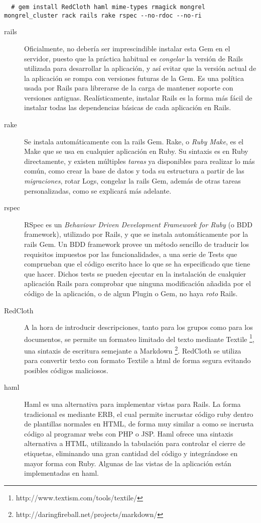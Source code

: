 \begin{verbatim}
  # gem install RedCloth haml mime-types rmagick mongrel mongrel_cluster rack rails rake rspec --no-rdoc --no-ri
\end{verbatim}

\begin{description}
  \item[rails] Oficialmente, no debería ser imprescindible instalar esta Gem en el servidor, puesto que la práctica habitual es \emph{congelar} la versión de Rails utilizada para desarrollar la aplicación, y así evitar que la versión actual de la aplicación se rompa con versiones futuras de la Gem. Es una política usada por Rails para librerarse de la carga de mantener soporte con versiones antiguas. Realísticamente, instalar Rails es la forma más fácil de instalar todas las dependencias básicas de cada aplicación en Rails.
  \item[rake] Se instala automáticamente con la rails Gem. Rake, o \emph{Ruby Make}, es el Make que se usa en cualquier aplicación en Ruby. Su sintaxis es en Ruby directamente, y existen múltiples \emph{tareas} ya disponibles para realizar lo más común, como crear la base de datos y toda su estructura a partir de las \emph{migraciones}, rotar Logs, congelar la rails Gem, además de otras tareas personalizadas, como se explicará más adelante. 
  \item[rspec] RSpec es un \emph{Behaviour Driven Development Framework for Ruby} (o BDD framework), utilizado por Rails, y que se instala automáticamente por la rails Gem. Un BDD framework provee un método sencillo de traducir los requisitos impuestos por las funcionalidades, a una serie de Tests que comprueban que el código escrito hace lo que se ha especificado que tiene que hacer. Dichos tests se pueden ejecutar en la instalación de cualquier aplicación Rails para comprobar que ninguna modificación añadida por el código de la aplicación, o de algun Plugin o Gem, no haya \emph{roto} Rails.
  \item[RedCloth] A la hora de introducir descripciones, tanto para los grupos como para los documentos, se permite un formateo limitado del texto mediante Textile \footnote{http://www.textism.com/tools/textile/}, una sintaxis de escritura semejante a Markdown \footnote{http://daringfireball.net/projects/markdown/}. RedCloth se utiliza para convertir texto con formato Textile a html de forma segura evitando posibles códigos maliciosos.
  \item[haml] Haml es una alternativa para implementar vistas para Rails. La forma tradicional es mediante ERB, el cual permite incrustar código ruby dentro de plantillas normales en HTML, de forma muy similar a como se incrusta código al programar webs con PHP o JSP. Haml ofrece una sintaxis alternativa a HTML, utilizando la tabulación para controlar el cierre de etiquetas, eliminando una gran cantidad del código y integrándose en mayor forma con Ruby. Algunas de las vistas de la aplicación están implementadas en haml.

\end{description}
